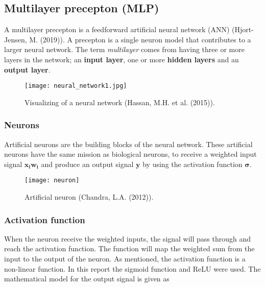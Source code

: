 \documentclass[11pt,english, A4]{article}
\begin{document}
\subsection{Multilayer precepton (MLP)}
A multilayer precepton is a feedforward artificial neural network (ANN) (Hjort-Jensen, M. (2019)). A precepton is a single neuron model that contributes to a larger neural network. The term \textit{multilayer} comes from having three or more layers in the network; an \textbf{input layer}, one or more \textbf{hidden layers} and an \textbf{output layer}.


\begin{figure}[H]
  \begin{center}
  \texttt{[image: neural\_network1.jpg]}
  \caption{Visualizing of a neural network (Hassan, M.H. et al. (2015)).}
  \end{center}
\end{figure}



\subsubsection{Neurons}
Artificial neurons are the building blocks of the neural network. These artificial neurons have the same mission as biological neurons, to receive a weighted input signal $\bm{x_i} \bm{w_i}$ and produce an output signal $\bm{y}$ by using the activation function $\bm{\sigma}$. 


\begin{figure}[H]
\begin{center}
  \texttt{[image: neuron]}
  \caption{Artificial neuron (Chandra, L.A. (2012)).}
\end{center}
\end{figure}

\subsubsection{Activation function}
When the neuron receive the weighted inputs, the signal will pass through and reach the activation function. The function will map the weighted sum from the input to the output of the neuron. As mentioned, the activation function is a non-linear function. In this report the sigmoid function and ReLU were used. The mathematical model for the output signal is given as
\end{document}
